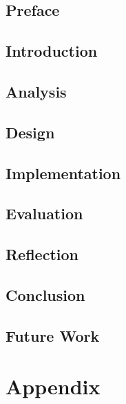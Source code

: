 





\chapter*{Preface}



\tableofcontents

\chapter{Introduction}




\chapter{Analysis}



\chapter{Design}


\chapter{Implementation}


\chapter{Evaluation}




\chapter{Reflection}


\chapter{Conclusion}


\chapter{Future Work}


\printbibliography

\part{Appendix}
\appendix


